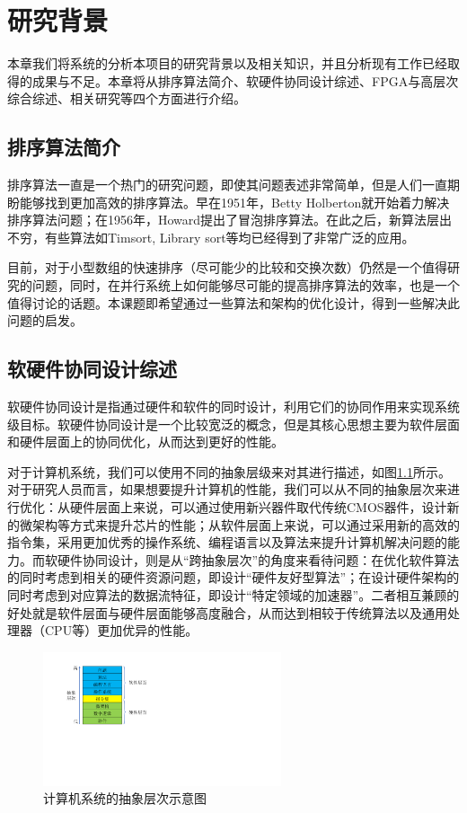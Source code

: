 
\chapter{研究背景}
\label{chap:background}
本章我们将系统的分析本项目的研究背景以及相关知识，并且分析现有工作已经取得的成果与不足。本章将从排序算法简介、软硬件协同设计综述、FPGA与高层次综合综述、相关研究等四个方面进行介绍。
\section{排序算法简介}

排序算法一直是一个热门的研究问题，即使其问题表述非常简单，但是人们一直期盼能够找到更加高效的排序算法。早在1951年，Betty Holberton就开始着力解决排序算法问题；在1956年，Howard提出了冒泡排序算法\cite{demuth1956report}。在此之后，新算法层出不穷，有些算法如Timsort\cite{mcilroy1993optimistic}, Library sort\cite{bender2006insertion}等均已经得到了非常广泛的应用。

目前，对于小型数组的快速排序（尽可能少的比较和交换次数）仍然是一个值得研究的问题，同时，在并行系统上如何能够尽可能的提高排序算法的效率，也是一个值得讨论的话题。本课题即希望通过一些算法和架构的优化设计，得到一些解决此问题的启发。


\section{软硬件协同设计综述}
软硬件协同设计是指通过硬件和软件的同时设计，利用它们的协同作用来实现系统级目标\cite{de1997hardware}。软硬件协同设计是一个比较宽泛的概念，但是其核心思想主要为软件层面和硬件层面上的协同优化，从而达到更好的性能。


对于计算机系统，我们可以使用不同的抽象层级来对其进行描述，如图\ref{fig:computer_system_abstract}所示。对于研究人员而言，如果想要提升计算机的性能，我们可以从不同的抽象层次来进行优化：从硬件层面上来说，可以通过使用新兴器件取代传统CMOS器件，设计新的微架构等方式来提升芯片的性能；从软件层面上来说，可以通过采用新的高效的指令集，采用更加优秀的操作系统、编程语言以及算法来提升计算机解决问题的能力。而软硬件协同设计，则是从“跨抽象层次”的角度来看待问题：在优化软件算法的同时考虑到相关的硬件资源问题，即设计“硬件友好型算法”；在设计硬件架构的同时考虑到对应算法的数据流特征，即设计“特定领域的加速器”。二者相互兼顾的好处就是软件层面与硬件层面能够高度融合，从而达到相较于传统算法以及通用处理器（CPU等）更加优异的性能。
\begin{figure}[htbp]
    \centering
    \includegraphics[width=7cm]{figures/computer_system_abstract.pdf}
    \caption{计算机系统的抽象层次示意图}
    \label{fig:computer_system_abstract}
\end{figure}

